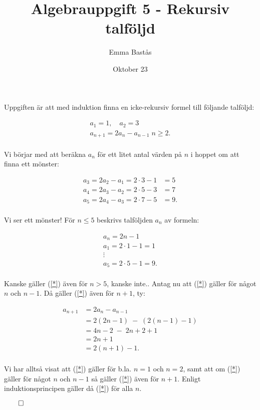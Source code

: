 \documentclass{article}
\title{Algebrauppgift 5  - Rekursiv talföljd}
\author{Emma Bastås}
\date{Oktober 23}
\begin{document}
\maketitle


\thispagestyle{empty}

\noindent Uppgiften är att med induktion finna en icke-rekursiv formel till följande talföljd:

\begin{gather*}
  a_{1} = 1, \quad
  a_{2} = 3 \\
  a_{n+1} = 2a_{n} - a_{n-1} \; n \geq 2\text{.}
\end{gather*}
\\
Vi börjar med att beräkna $a_{n}$ för ett litet antal värden på $n$ i hoppet om att finna ett mönster:

\begin{align*}
  a_{3} = 2a_{2} - a_{1} = 2\cdot3 - 1 &= 5 \\
  a_{4} = 2a_{3} - a_{2} = 2\cdot5 - 3 &= 7 \\
  a_{5} = 2a_{4} - a_{3} = 2\cdot7 - 5 &= 9\text{.}
\end{align*}
\\
Vi ser ett mönster! För $n \leq 5$ beskrivs talföljden $a_{n}$ av formeln:

\begin{gather*}
  a_{n} = 2n - 1 \tag{$\star$}\label{*} \\[10pt]
  a_{1} = 2\cdot1 - 1 = 1\\[-6pt]
  \vdots \\[-2pt]
  a_{5} = 2\cdot5 - 1 = 9\text{.}
\end{gather*}
\\
Kanske gäller (\ref{*}) även för $n > 5$, kanske inte.. Antag nu att (\ref{*}) gäller för något $n$ och $n-1$. Då gäller (\ref{*}) även för $n+1$, ty:

\begin{align*}
  a_{n+1} &= 2a_{n} - a_{n - 1} \\
          &= 2(2n - 1) \;-\; (2(n - 1) - 1) \\
          &= 4n - 2 \;-\; 2n + 2 + 1 \\
          &= 2n + 1 \\
  &= 2(n+1) - 1\text{.}
\end{align*}
\\
Vi har alltså visat att (\ref{*}) gäller för b.la. $n = 1$ och $n = 2$, samt att om (\ref{*}) gäller för något $n$ och $n-1$ så gäller (\ref{*}) även för $n+1$. Enligt induktionsprincipen gäller då (\ref{*}) för alla $n$.
\\[8pt]
\centerline{$\qed$}

\thispagestyle{empty}
\end{document}
